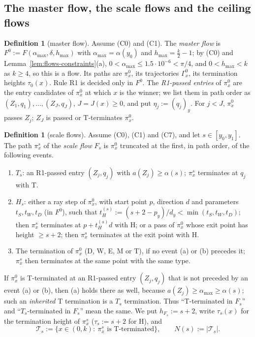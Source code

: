 \documentclass[11pt]{amsart}
\newcommand{\amax}{\alpha_{\max}}
\newcommand{\hmax}{h_{\max}}
\newcommand{\Fz}{F^{0}}
\newcommand{\Fs}{F_{s}}
\theoremstyle{definition}
\newtheorem{definition}[theorem]{Definition}
\theoremstyle{remark}
\numberwithin{equation}{section}
\begin{document}
\subsection{The master flow, the scale flows and the ceiling flows}\label{ssec:flows-family}

\begin{definition}[master flow]\label{def:F0}
Assume \textup{(C0)} and \textup{(C1)}. The \emph{master flow} is $\Fz:=F(\amax,\delta,\hmax)$ with $\amax=\alpha(y_0)$
and $\hmax=\frac k2-1$; by (C0) and Lemma~\ref{lem:flows-constraints}(a), $0<\amax\le1.5\cdot10^{-6}<\pi/4$, and
$0<\hmax<k$ as $k\ge4$, so this is a flow. Its
paths are $\pi^0_x$, its trajectories $\Gamma^0_x$, its termination heights $\tau_0(x)$. Rule R1 is decided only in
$\Fz$. The \emph{R1-passed entries} of $\pi^0_x$ are the entry candidates of $\pi^0_x$ at which $x$ is the winner; we list
them in path order as $(Z_1,q_1),\dots,(Z_J,q_J)$, $J=J(x)\ge0$, and put $\eta_j:=(q_j)_y$. For $j<J$, $\pi^0_x$ passes
$Z_j$; $Z_J$ is passed or T-terminates $\pi^0_x$.
\end{definition}

\begin{definition}[scale flows]\label{def:Fs}
Assume \textup{(C0)}, \textup{(C1)} and \textup{(C7)}, and let $s\in[y_0,y_1]$. The path $\pi^s_x$ of the \emph{scale
flow} $\Fs$ is $\pi^0_x$ truncated at the first, in path order, of the following events.
\begin{enumerate}
\item[(a)] $T_s$: an R1-passed entry $(Z_j,q_j)$ with $a(Z_j)\ge\alpha(s)$; $\pi^s_x$ terminates at $q_j$ with T.
\item[(b)] $H_s$: either a ray step of $\pi^0_x$, with start point $p$, direction $d$ and parameters
$t_S,t_W,t_D$ (in $\Fz$), such that $t^{(s)}_H:=(s+2-p_y)/d_y<\min(t_S,t_W,t_D)$; then $\pi^s_x$ terminates at
$p+t^{(s)}_Hd$ with H; or a pass of $\pi^0_x$ whose exit point has height $\ge s+2$; then $\pi^s_x$ terminates at the
exit point with H.
\item[(c)] The termination of $\pi^0_x$ (D, W, E, M or T), if no event (a) or (b) precedes it; $\pi^s_x$ then
terminates at the same point with the same type.
\end{enumerate}
If $\pi^0_x$ is T-terminated at an R1-passed entry $(Z_j,q_j)$ that is not preceded by an event (a) or (b), then (a)
holds there as well, because $a(Z_j)\ge\amax\ge\alpha(s)$; such an \emph{inherited} T termination is a $T_s$
termination. Thus ``T-terminated in $\Fs$'' and ``$T_s$-terminated in $\Fs$'' mean the same. We put $h_{\Fs}:=s+2$,
write $\tau_s(x)$ for the termination height of $\pi^s_x$ ($\tau_s:=s+2$ for H), and
\[
\mathcal T_s:=\{x\in(0,k):\ \pi^s_x\text{ is T-terminated}\},\qquad N(s):=|\mathcal T_s| .
\]
\end{definition}
\end{document}

